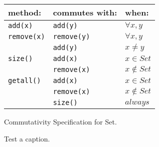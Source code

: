 \begin{tabular}{lll}
\textbf{method:} & \textbf{commutes with:} & \textbf{when:} \\
\hline
\texttt{add(x)} & \texttt{add(y)} & $\forall x, y$ \\
\texttt{remove(x)} & \texttt{remove(y)} & $\forall x, y$ \\
    & \texttt{add(y)} & $x \ne y$ \\
\texttt{size()} & \texttt{add(x)} & $x \in Set$ \\
    & \texttt{remove(x)} & $x \notin Set$ \\
\texttt{getall()} & \texttt{add(x)} & $x \in Set$ \\
    & \texttt{remove(x)} & $x \notin Set$ \\
    & \texttt{size()} & $always$ \\
    \hline
\end{tabular}
\caption{Commutativity Specification for Set.}
\label{tab:spec}
Test a caption.